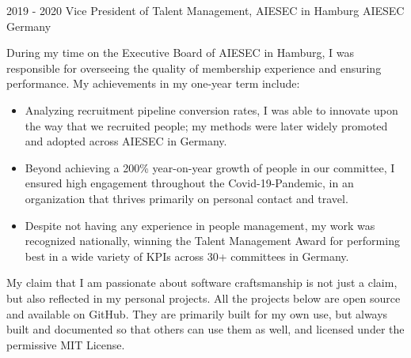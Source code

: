 \documentclass[9pt]{developercv} %
\begin{document}
    \begin{entrylist}
        \entry
        {2019 - 2020}
        {Vice President of Talent Management, AIESEC in Hamburg}
        {AIESEC Germany}
        {During my time on the Executive Board of AIESEC in Hamburg, I was responsible for overseeing the quality of membership experience and ensuring performance. My achievements in my one-year term include:

            \begin{itemize}
                \item Analyzing recruitment pipeline conversion rates, I was able to innovate upon the way that we recruited people; my methods were later widely promoted and adopted across AIESEC in Germany.
                \item Beyond achieving a 200\% year-on-year growth of people in our committee, I ensured high engagement throughout the Covid-19-Pandemic, in an organization that thrives primarily on personal contact and travel.
                \item Despite not having any experience in people management, my work was recognized nationally, winning the Talent Management Award for performing best in a wide variety of KPIs across 30+ committees in Germany.
            \end{itemize}
        }
    \end{entrylist}



    My claim that I am passionate about software craftsmanship is not just a claim, but also reflected in my personal projects.
    All the projects below are open source and available on GitHub.
    They are primarily built for my own use, but always built and documented so that others can use them as well,
    and licensed under the permissive MIT License. \\
\end{document}
